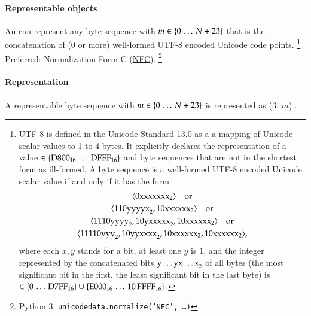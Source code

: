 \paragraph{Representable objects}

An \DborUtfEightStringValue{} can represent any byte sequence 
with $m \in \{0 \,\ldots\, N + 23\}$ that is the concatenation of ($0$ or more)
well-formed UTF-8 encoded Unicode code points.%
\footnote{
    UTF-8 is defined in the
    \href{https://www.unicode.org/versions/Unicode13.0.0/ch03.pdf\#G31703}{Unicode Standard 13.0}
    as a a mapping of Unicode scalar values to 1 to 4 bytes.
    It explicitly declares the representation of a value $\in \{\mathrm{D800}_{16} \,\ldots\, \mathrm{DFFF}_{16}\}$
    and byte sequences that are not in the shortest form as ill-formed.
    A byte sequence  is a well-formed UTF-8 encoded Unicode scalar value if and
    only if it has the form
    \begin{gather*}
        \langle \mathrm{0xxxxxxx}_{2} \rangle \quad\text{or} \\
        \langle \mathrm{110yyyyx}_{2}, \mathrm{10xxxxxx}_{2} \rangle \quad\text{or} \\
        \langle \mathrm{1110yyyy}_{2}, \mathrm{10yxxxxx}_{2}, \mathrm{10xxxxxx}_{2} \rangle \quad\text{or} \\
        \langle \mathrm{11110yyy}_{2}, \mathrm{10yyxxxx}_{2}, \mathrm{10xxxxxx}_{2}, \mathrm{10xxxxxx}_{2} \rangle,
    \end{gather*}
    where each $x, y$ stands for a bit, at least one $y$ is $1$, and the integer represented by
    the concatenated bits $\mathrm{y \ldots y x \ldots x}_{2}$ of all bytes
    (the most significant bit in the first, the least significant bit in the last byte) is
    $\in \{0 \,\ldots\, \mathrm{D7FF}_{16}\} \cup \{\mathrm{E000}_{16} \,\ldots\, \mathrm{10\,FFFF}_{16}\}$.
}
Preferred: Normalization Form C (\href{https://www.unicode.org/versions/Unicode13.0.0/ch03.pdf\#G31703}{NFC}).%
\footnote{
    Python 3: \texttt{unicodedata.normalize('NFC', \dots)}
}

\paragraph{Representation}

A representable byte sequence  with $m \in \{0 \,\ldots\, N + 23\}$
is represented as \DborIntegerToken*($3$, $m$) {\Concat} .

